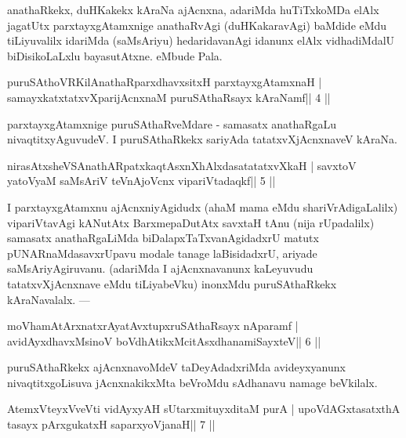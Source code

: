 \begin{artha}
anathaRkekx, duHKakekx kAraNa ajAcnxna, adariMda huTiTxkoMDa elAlx jagatUtx parxtayxgAtamxnige anathaRvAgi (duHKakaravAgi) baMdide eMdu tiLiyuvalilx idariMda (saMsAriyu) hedaridavanAgi idanunx elAlx vidhadiMdalU biDisikoLaLxlu bayasutAtxne. eMbude Pala.
\end{artha}

\begin{shl}
puruSAthoVR\s KilAnathaRparxdhavxsitxH parxtayxgAtamxnaH |
samayxkatxtatxvXparijAcnxnaM puruSAthaRsayx kAraNamf\hfill || 4 ||
\end{shl}

\begin{artha}
parxtayxgAtamxnige puruSAthaRveMdare - samasatx anathaRgaLu  nivaqtitxyAguvudeV. I puruSAthaRkekx sariyAda tatatxvXjAcnxnaveV kAraNa.
\end{artha}


\begin{shl}
nirasAtxsheVSAnathARpatxkaqtAsxnXhAlxdasatatatxvXkaH |
savxtoV yatoV\s yaM saMsAriV teVnAjoVcnx vipariVtadaqkf\hfill || 5 ||
\end{shl}

\begin{artha}
I parxtayxgAtamxnu ajAcnxniyAgidudx (ahaM mama eMdu shariVrAdigaLalilx) 
vipariVtavAgi kANutAtx BarxmepaDutAtx savxtaH tAnu (nija rUpadalilx) samasatx anathaRgaLiMda biDalapxTaTxvanAgidadxrU matutx pUNARnaMdasavxrUpavu modale tanage laBisidadxrU, ariyade saMsAriyAgiruvanu. (adariMda I ajAcnxnavanunx kaLeyuvudu tatatxvXjAcnxnave eMdu tiLiyabeVku) inonxMdu puruSAthaRkekx kAraNavalalx.  {\rm ---} 
\end{artha}

\begin{shl}
moVhamAtArxnatxrAyatAvxtupxruSAthaRsayx nAparamf |
avidAyxdhavxMsinoV boVdhAtikxMcitAsxdhanamiSayxteV\hfill || 6 ||
\end{shl}

\begin{artha}
puruSAthaRkekx ajAcnxnavoMdeV taDeyAdadxriMda avideyxyanunx nivaqtitxgoLisuva jAcnxnakikxMta beVroMdu sAdhanavu namage beVkilalx.
\end{artha}


\begin{shl}
AtemxVteyxVveVti vidAyxyAH sUtarxmituyxditaM purA |
upoVdAGxtasatxthA tasayx pArxgukatxH saparxyoVjanaH\hfill || 7 ||
\end{shl}

